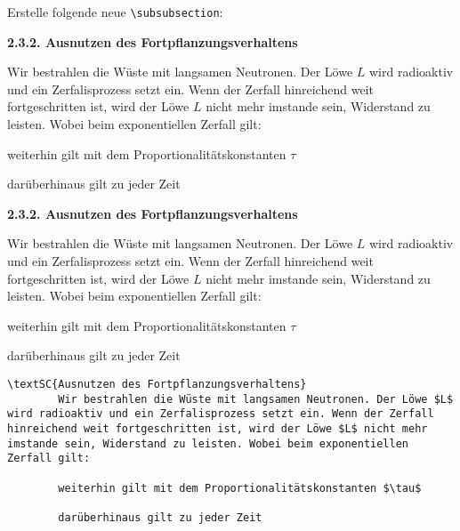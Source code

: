 \begin{frame}[fragile]
	\Aufgabee
		Erstelle folgende neue \lstinline[basicstyle=\normalfont\normalsize]|\subsubsection|:
	\begin{outputbox}
	    { \large\textbf{2.3.2. Ausnutzen des Fortpflanzungsverhaltens} } 
	
	    Wir bestrahlen die Wüste mit langsamen Neutronen. Der Löwe $L$ wird radioaktiv und ein Zerfalisprozess setzt ein. Wenn der Zerfall hinreichend weit fortgeschritten ist, wird der Löwe $L$ nicht mehr imstande sein, Widerstand zu leisten. Wobei beim exponentiellen Zerfall gilt:
	
	    weiterhin gilt mit dem Proportionalitätskonstanten $\tau$
	
	    darüberhinaus gilt zu jeder Zeit	
    \end{outputbox}
	\vspace{0.3cm}
\end{frame}
\begin{frame}[fragile]
	\vspace{-0.2cm}\Losung
	\begin{outputbox}
	    { \large\textbf{2.3.2. Ausnutzen des Fortpflanzungsverhaltens} } 
	
	    Wir bestrahlen die Wüste mit langsamen Neutronen. Der Löwe $L$ wird radioaktiv und
	    ein Zerfalisprozess setzt ein. Wenn der Zerfall hinreichend weit fortgeschritten ist, wird der Löwe $L$ nicht mehr imstande sein, Widerstand zu leisten. Wobei beim exponentiellen Zerfall gilt:
	
	    weiterhin gilt mit dem Proportionalitätskonstanten $\tau$
	
	    darüberhinaus gilt zu jeder Zeit
	    \vspace{-0.1cm}
	\end{outputbox}

	\vspace{-0.1cm}\Code
	\begin{lstlisting}[gobble=4]
    \textSC{Ausnutzen des Fortpflanzungsverhaltens}  
	    Wir bestrahlen die Wüste mit langsamen Neutronen. Der Löwe $L$ wird radioaktiv und ein Zerfalisprozess setzt ein. Wenn der Zerfall hinreichend weit fortgeschritten ist, wird der Löwe $L$ nicht mehr imstande sein, Widerstand zu leisten. Wobei beim exponentiellen Zerfall gilt:

	    weiterhin gilt mit dem Proportionalitätskonstanten $\tau$

	    darüberhinaus gilt zu jeder Zeit
	\end{lstlisting}
\end{frame}

